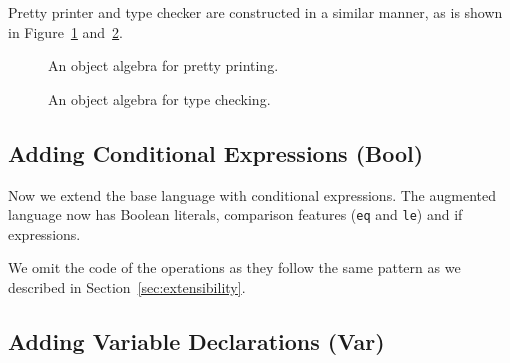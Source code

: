 Pretty printer and type checker are constructed in a similar manner, as is shown
in Figure~\ref{fig:printer} and~\ref{fig:checker}.

\begin{figure}[t]
  \centering
  \caption{An object algebra for pretty printing. }
  \label{fig:printer}
\end{figure}

\begin{figure}[t]
  \centering
  \caption{An object algebra for type checking. }
  \label{fig:checker}
\end{figure}


\subsection{Adding Conditional Expressions (Bool)}

Now we extend the base language with conditional expressions.
The augmented language now has Boolean literals, comparison features
(\lstinline{eq} and \lstinline{le}) and if expressions.

We omit the code of the operations as they follow the same pattern as we
described in Section~\ref{sec:extensibility}.





\subsection{Adding Variable Declarations (Var)}

